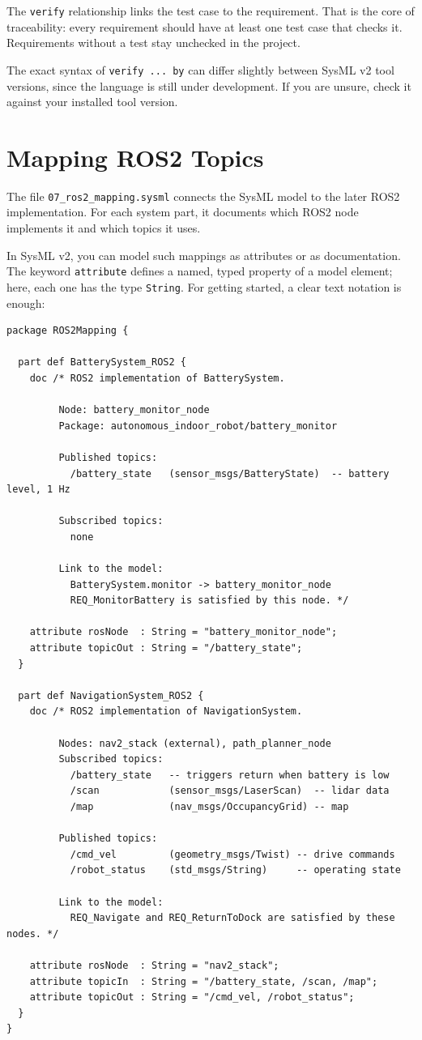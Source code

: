 The \texttt{verify} relationship links the test case to the requirement. That is the core of traceability: every requirement should have at least one test case that checks it. Requirements without a test stay unchecked in the project.

The exact syntax of \texttt{verify ... by} can differ slightly between SysML v2 tool versions, since the language is still under development. If you are unsure, check it against your installed tool version.

\section{Mapping ROS2 Topics}

The file \texttt{07\_ros2\_mapping.sysml} connects the SysML model to the later ROS2 implementation. For each system part, it documents which ROS2 node implements it and which topics it uses.

In SysML v2, you can model such mappings as attributes or as documentation. The keyword \texttt{attribute} defines a named, typed property of a model element; here, each one has the type \texttt{String}. For getting started, a clear text notation is enough:

\begin{lstlisting}
package ROS2Mapping {

  part def BatterySystem_ROS2 {
    doc /* ROS2 implementation of BatterySystem.

         Node: battery_monitor_node
         Package: autonomous_indoor_robot/battery_monitor

         Published topics:
           /battery_state   (sensor_msgs/BatteryState)  -- battery level, 1 Hz

         Subscribed topics:
           none

         Link to the model:
           BatterySystem.monitor -> battery_monitor_node
           REQ_MonitorBattery is satisfied by this node. */

    attribute rosNode  : String = "battery_monitor_node";
    attribute topicOut : String = "/battery_state";
  }

  part def NavigationSystem_ROS2 {
    doc /* ROS2 implementation of NavigationSystem.

         Nodes: nav2_stack (external), path_planner_node
         Subscribed topics:
           /battery_state   -- triggers return when battery is low
           /scan            (sensor_msgs/LaserScan)  -- lidar data
           /map             (nav_msgs/OccupancyGrid) -- map

         Published topics:
           /cmd_vel         (geometry_msgs/Twist) -- drive commands
           /robot_status    (std_msgs/String)     -- operating state

         Link to the model:
           REQ_Navigate and REQ_ReturnToDock are satisfied by these nodes. */

    attribute rosNode  : String = "nav2_stack";
    attribute topicIn  : String = "/battery_state, /scan, /map";
    attribute topicOut : String = "/cmd_vel, /robot_status";
  }
}
\end{lstlisting}

